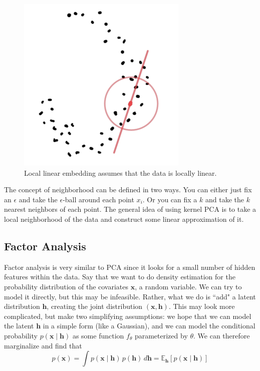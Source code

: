 \documentclass{article}
\begin{document}
    \begin{figure}[H]
      \centering 
      \includegraphics[scale=0.4]{img/local_linear_embedding.png}
      \caption{Local linear embedding assumes that the data is locally linear. } 
      \label{fig:local_linear_embedding}
    \end{figure}

    The concept of neighborhood can be defined in two ways. You can either just fix an $\epsilon$ and take the $\epsilon$-ball around each point $x_i$. Or you can fix a $k$ and take the $k$ nearest neighbors of each point. The general idea of using kernel PCA is to take a local neighborhood of the data and construct some linear approximation of it. 

  \subsection{Factor Analysis}

    Factor analysis is very similar to PCA since it looks for a small number of hidden features within the data. Say that we want to do density estimation for the probability distribution of the covariates $\mathbf{x}$, a random variable. We can try to model it directly, but this may be infeasible. Rather, what we do is ``add" a latent distribution $\mathbf{h}$, creating the joint distribution $(\mathbf{x}, \mathbf{h})$. This may look more complicated, but make two simplifying assumptions: we hope that we can model the latent $\mathbf{h}$ in a simple form (like a Gaussian), and we can model the conditional probability $p(\mathbf{x} \mid \mathbf{h})$ as some function $f_\theta$ parameterized by $\theta$. We can therefore marginalize and find that 
    \begin{equation} 
      p(\mathbf{x}) = \int p(\mathbf{x} \mid \mathbf{h}) \, p(\mathbf{h}) \,d\mathbf{h} = \mathbb{E}_\mathbf{h} [p(\mathbf{x} \mid \mathbf{h})] 
    \end{equation}
\end{document}
